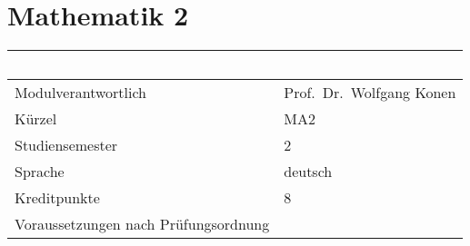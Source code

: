 \chapter{Mathematik 2}\label{mathematik-2}

\begin{longtable}[]{@{}ll@{}}
\toprule
\begin{minipage}[b]{0.12\columnwidth}\raggedright\strut
~\strut
\end{minipage} & \begin{minipage}[b]{0.12\columnwidth}\raggedright\strut
~\strut
\end{minipage}\tabularnewline
\midrule
\endhead
\begin{minipage}[t]{0.12\columnwidth}\raggedright\strut
Modulverantwortlich\strut
\end{minipage} & \begin{minipage}[t]{0.12\columnwidth}\raggedright\strut
Prof.~Dr.~Wolfgang Konen\strut
\end{minipage}\tabularnewline
\begin{minipage}[t]{0.12\columnwidth}\raggedright\strut
Kürzel\strut
\end{minipage} & \begin{minipage}[t]{0.12\columnwidth}\raggedright\strut
MA2\strut
\end{minipage}\tabularnewline
\begin{minipage}[t]{0.12\columnwidth}\raggedright\strut
Studiensemester\strut
\end{minipage} & \begin{minipage}[t]{0.12\columnwidth}\raggedright\strut
2\strut
\end{minipage}\tabularnewline
\begin{minipage}[t]{0.12\columnwidth}\raggedright\strut
Sprache\strut
\end{minipage} & \begin{minipage}[t]{0.12\columnwidth}\raggedright\strut
deutsch\strut
\end{minipage}\tabularnewline
\begin{minipage}[t]{0.12\columnwidth}\raggedright\strut
Kreditpunkte\strut
\end{minipage} & \begin{minipage}[t]{0.12\columnwidth}\raggedright\strut
8\strut
\end{minipage}\tabularnewline
\begin{minipage}[t]{0.12\columnwidth}\raggedright\strut
Voraussetzungen nach Prüfungsordnung\strut
\end{minipage} & \begin{minipage}[t]{0.12\columnwidth}\raggedright\strut

\end{minipage}
\end{longtable}
